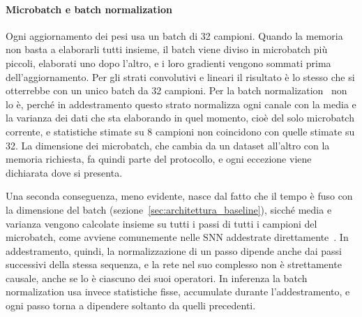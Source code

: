 \paragraph{Microbatch e batch normalization}
\label{subsec:microbatch_bn}
Ogni aggiornamento dei pesi usa un batch di 32 campioni. Quando la memoria non basta a elaborarli tutti insieme, il batch viene diviso in microbatch più piccoli, elaborati uno dopo l'altro, e i loro gradienti vengono sommati prima dell'aggiornamento. Per gli strati convolutivi e lineari il risultato è lo stesso che si otterrebbe con un unico batch da 32 campioni. Per la batch normalization~\cite{ioffe2015batch} non lo è, perché in addestramento questo strato normalizza ogni canale con la media e la varianza dei dati che sta elaborando in quel momento, cioè del solo microbatch corrente, e statistiche stimate su 8 campioni non coincidono con quelle stimate su 32. La dimensione dei microbatch, che cambia da un dataset all'altro con la memoria richiesta, fa quindi parte del protocollo, e ogni eccezione viene dichiarata dove si presenta.

Una seconda conseguenza, meno evidente, nasce dal fatto che il tempo è fuso con la dimensione del batch (sezione~\ref{sec:architettura_baseline}), sicché media e varianza vengono calcolate insieme su tutti i passi di tutti i campioni del microbatch, come avviene comunemente nelle SNN addestrate direttamente~\cite{zheng2021going}. In addestramento, quindi, la normalizzazione di un passo dipende anche dai passi successivi della stessa sequenza, e la rete nel suo complesso non è strettamente causale, anche se lo è ciascuno dei suoi operatori. In inferenza la batch normalization usa invece statistiche fisse, accumulate durante l'addestramento, e ogni passo torna a dipendere soltanto da quelli precedenti.

